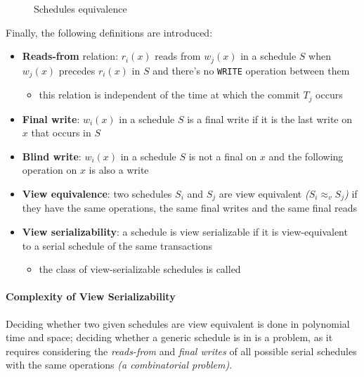 \documentclass[english]{article}
\begin{document}
\begin{figure}[htbp]
  \bigskip
  \centering
  \caption{Schedules equivalence}
  \label{fig:schedules-equivalence}
  \bigskip
\end{figure}

Finally, the following definitions are introduced:

\begin{itemize}
  \item \textbf{Reads-from} relation: \(r_i(x)\) reads from \(w_j(x)\) in a schedule \(S\) when \(w_j(x)\) precedes \(r_i(x)\) in \(S\) and there's no \texttt{WRITE} operation between them
        \begin{itemize}
          \item this relation is independent of the time at which the commit \(T_j\) occurs
        \end{itemize}
  \item \textbf{Final write}: \(w_i(x)\) in a schedule \(S\) is a final write if it is the last write on \(x\) that occurs in \(S\)
  \item \textbf{Blind write}: \(w_i(x)\) in a schedule \(S\) is not a final on \(x\) and the following operation on \(x\) is also a write
  \item \textbf{View equivalence}: two schedules \(S_i\) and \(S_j\) are view equivalent \textit{(\(S_i \approx_v S_j\))} if they have the same operations, the same final writes and the same final reads
  \item \textbf{View serializability}: a schedule is view serializable if it is view-equivalent to a serial schedule of the same transactions
        \begin{itemize}
          \item the class of view-serializable schedules is called \vsr
        \end{itemize}
\end{itemize}

\paragraph{Complexity of View Serializability}

Deciding whether two given schedules are view equivalent is done in polynomial time and space;
deciding whether a generic schedule is in \vsr is a \NPC problem, as it requires considering the \textit{reads-from} and \textit{final writes} of all possible serial schedules with the same operations \textit{(a combinatorial problem)}.
\end{document}
